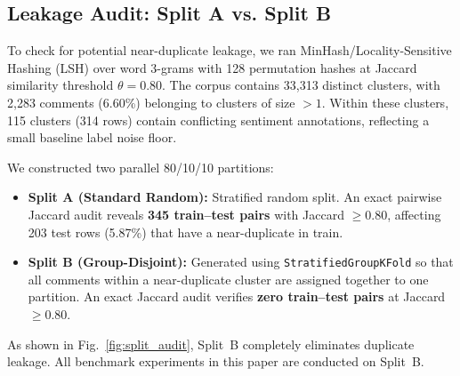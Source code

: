 \documentclass[10pt,conference]{IEEEtran}
\begin{document}
\begin{table}[t]
\caption{CMTE-NITANP and CMTET Corpus Statistics. Lengths are reported on normalized text as mean / median.}
\label{tab:corpus_stats}
\centering
\footnotesize
\setlength{\tabcolsep}{4pt}
\end{table}

\subsection{Leakage Audit: Split A vs. Split B}
To check for potential near-duplicate leakage, we ran MinHash/Locality-Sensitive Hashing (LSH) over word 3-grams with 128 permutation hashes at Jaccard similarity threshold $\theta = 0.80$. The corpus contains 33{,}313 distinct clusters, with 2{,}283 comments (6.60\%) belonging to clusters of size $> 1$. Within these clusters, 115 clusters (314 rows) contain conflicting sentiment annotations, reflecting a small baseline label noise floor.

We constructed two parallel 80/10/10 partitions:
\begin{itemize}
    \item \textbf{Split A (Standard Random):} Stratified random split. An exact pairwise Jaccard audit reveals \textbf{345 train--test pairs} with Jaccard $\ge 0.80$, affecting 203 test rows (5.87\%) that have a near-duplicate in train.
    \item \textbf{Split B (Group-Disjoint):} Generated using \texttt{StratifiedGroupKFold} so that all comments within a near-duplicate cluster are assigned together to one partition. An exact Jaccard audit verifies \textbf{zero train--test pairs} at Jaccard $\ge 0.80$.
\end{itemize}
As shown in Fig.~\ref{fig:split_audit}, Split~B completely eliminates duplicate leakage. All benchmark experiments in this paper are conducted on Split~B.
\end{document}
